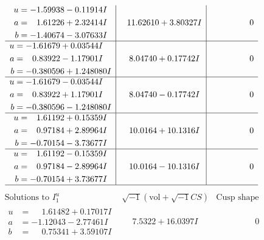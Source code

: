 \documentclass[1p]{elsarticle_modified}
\theoremstyle{definition}
\newcommand{\I}{\sqrt{-1}}
\begin{document}
$$\begin{array}{c|c|c}
\begin{aligned}
u &= -1.59938 - 0.11914 I \\
a &= \phantom{-}1.61226 + 2.32414 I \\
b &= -1.40674 - 3.07633 I\end{aligned}
 & \phantom{-}11.62610 + 3.80327 I & \phantom{-0.000000 } 0 \\ \hline\begin{aligned}
u &= -1.61679 + 0.03544 I \\
a &= \phantom{-}0.83922 - 1.17901 I \\
b &= -0.380596 + 1.248080 I\end{aligned}
 & \phantom{-}8.04740 + 0.17742 I & \phantom{-0.000000 } 0 \\ \hline\begin{aligned}
u &= -1.61679 - 0.03544 I \\
a &= \phantom{-}0.83922 + 1.17901 I \\
b &= -0.380596 - 1.248080 I\end{aligned}
 & \phantom{-}8.04740 - 0.17742 I & \phantom{-0.000000 } 0 \\ \hline\begin{aligned}
u &= \phantom{-}1.61192 + 0.15359 I \\
a &= \phantom{-}0.97184 + 2.89964 I \\
b &= -0.70154 - 3.73677 I\end{aligned}
 & \phantom{-}10.0164 + 10.1316 I & \phantom{-0.000000 } 0 \\ \hline\begin{aligned}
u &= \phantom{-}1.61192 - 0.15359 I \\
a &= \phantom{-}0.97184 - 2.89964 I \\
b &= -0.70154 + 3.73677 I\end{aligned}
 & \phantom{-}10.0164 - 10.1316 I & \phantom{-0.000000 } 0\\
 \hline 
 \end{array}$$\newpage$$\begin{array}{c|c|c}  
\text{Solutions to }I^u_{1}& \I (\text{vol} + \sqrt{-1}CS) & \text{Cusp shape}\\
 \hline 
\begin{aligned}
u &= \phantom{-}1.61482 + 0.17017 I \\
a &= -1.12043 - 2.77461 I \\
b &= \phantom{-}0.75341 + 3.59107 I\end{aligned}
 & \phantom{-}7.5322 + 16.0397 I & \phantom{-0.000000 } 0 \\ \hline\begin{aligned}

\end{aligned}
\end{array}$$
\end{document}
